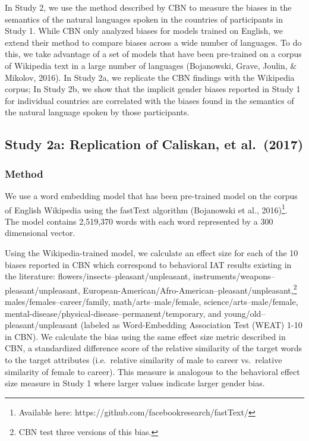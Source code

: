 \documentclass[10pt, letterpaper]{article}
\begin{document}
In Study 2, we use the method described by CBN to measure the biases in
the semantics of the natural languages spoken in the countries of
participants in Study 1. While CBN only analyzed biases for models
trained on English, we extend their method to compare biases across a
wide number of languages. To do this, we take advantage of a set of
models that have been pre-trained on a corpus of Wikipedia text in a
large number of languages (Bojanowski, Grave, Joulin, \& Mikolov, 2016).
In Study 2a, we replicate the CBN findings with the Wikipedia corpus; In
Study 2b, we show that the implicit gender biases reported in Study 1
for individual countries are correlated with the biases found in the
semantics of the natural language spoken by those participants.

\subsection{Study 2a: Replication of Caliskan, et
al.~(2017)}\label{study-2a-replication-of-caliskan-et-al.2017}

\subsubsection{Method}\label{method-1}

We use a word embedding model that has been pre-trained model on the
corpus of English Wikipedia using the fastText algorithm (Bojanowski et
al.,
2016)\footnote{Available here: https://github.com/facebookresearch/fastText/}.
The model contains 2,519,370 words with each word represented by a 300
dimensional vector.

Using the Wikipedia-trained model, we calculate an effect size for each
of the 10 biases reported in CBN which correspond to behavioral IAT
results existing in the literature:
flowers/insects--pleasant/unpleasant,
instruments/weapons--pleasant/unpleasant,
European-American/Afro-American--pleasant/unpleasant,\footnote{CBN test three versions of this bias.}
males/females--career/family, math/arts--male/female,
science/arts--male/female,
mental-disease/physical-disease--permanent/temporary, and
young/old--pleasant/unpleasant (labeled as Word-Embedding Association
Test (WEAT) 1-10 in CBN). We calculate the bias using the same effect
size metric described in CBN, a standardized difference score of the
relative similarity of the target words to the target attributes
(i.e.~relative similarity of male to career vs.~relative similarity of
female to career). This measure is analogous to the behavioral effect
size measure in Study 1 where larger values indicate larger gender bias.
\end{document}

